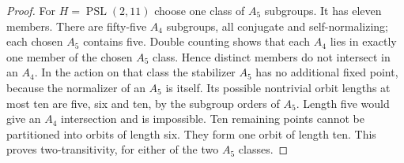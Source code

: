 \documentclass[11pt]{article}
\newcommand{\PSL}{\operatorname{PSL}}
\begin{document}
\begin{proof}
For $H=\PSL(2,11)$ choose one class of $A_5$ subgroups. It has
eleven members. There are fifty-five $A_4$ subgroups, all conjugate
and self-normalizing; each chosen $A_5$ contains five. Double
counting shows that each $A_4$ lies in exactly one member of the
chosen $A_5$ class. Hence distinct members do not intersect in
an $A_4$. In the action on that class the stabilizer $A_5$ has no
additional fixed point, because the normalizer of an $A_5$ is itself.
Its possible nontrivial orbit lengths at most ten are five, six
and ten, by the subgroup orders of $A_5$. Length five would give
an $A_4$ intersection and is impossible. Ten remaining points
cannot be partitioned into orbits of length six. They form one
orbit of length ten. This proves two-transitivity, for either
of the two $A_5$ classes.
\end{proof}
\end{document}

